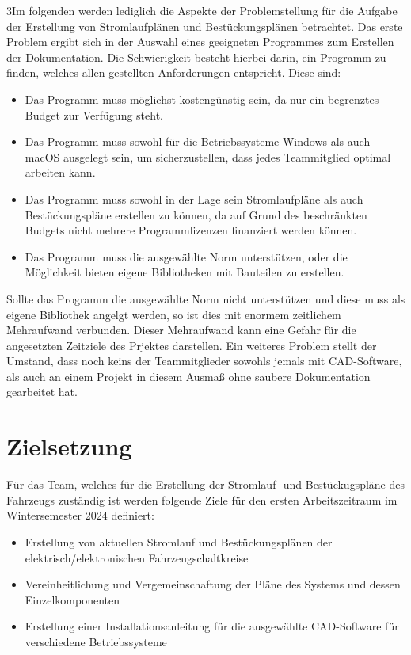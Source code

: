 3Im folgenden werden lediglich die Aspekte der Problemstellung für die Aufgabe der Erstellung von Stromlaufplänen und Bestückungsplänen betrachtet. Das erste Problem ergibt sich in der Auswahl eines geeigneten Programmes zum Erstellen der Dokumentation. Die Schwierigkeit besteht hierbei darin, ein Programm zu finden, welches allen gestellten Anforderungen entspricht. Diese sind: 
\begin{itemize}
	\item Das Programm muss möglichst kostengünstig sein, da nur ein begrenztes Budget zur Verfügung steht.
	\item Das Programm muss sowohl für die Betriebssysteme Windows als auch macOS ausgelegt sein, um sicherzustellen, dass jedes Teammitglied optimal arbeiten kann.
	\item Das Programm muss sowohl in der Lage sein Stromlaufpläne als auch Bestückungspläne erstellen zu können, da auf Grund des beschränkten Budgets nicht mehrere Programmlizenzen finanziert werden können.
	\item Das Programm muss die ausgewählte Norm unterstützen, oder die Möglichkeit bieten eigene Bibliotheken mit Bauteilen zu erstellen.
\end{itemize}   
Sollte das Programm die ausgewählte Norm nicht unterstützen und diese muss als eigene Bibliothek angelgt werden, so ist dies mit enormem zeitlichem Mehraufwand verbunden. Dieser Mehraufwand kann eine Gefahr für die angesetzten Zeitziele des Prjektes darstellen. 
Ein weiteres Problem stellt der Umstand, dass noch keins der Teammitglieder sowohls jemals mit CAD-Software, als auch an einem Projekt in diesem Ausmaß  ohne saubere Dokumentation gearbeitet hat.

\section*{Zielsetzung}
Für das Team, welches für die \glqq Erstellung der Stromlauf- und Bestückugspläne des Fahrzeugs \grqq zuständig ist werden folgende Ziele für den ersten Arbeitszeitraum im Wintersemester 2024 definiert:
\begin{itemize}
	\item Erstellung von aktuellen Stromlauf und Bestückungsplänen der elektrisch/elektronischen Fahrzeugschaltkreise
	\item Vereinheitlichung und Vergemeinschaftung der Pläne des Systems und dessen Einzelkomponenten
	\item Erstellung einer Installationsanleitung für die ausgewählte CAD-Software für verschiedene Betriebssysteme
\end{itemize}


